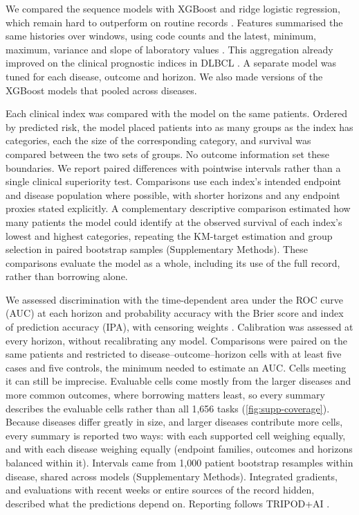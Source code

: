 We compared the sequence models with XGBoost \citep{chen2016xgboost} and ridge
logistic regression, which remain hard to outperform on routine records
\citep{grinsztajn2022tabular}. Features summarised the same histories over
 windows, using code counts and the latest,
minimum, maximum, variance and slope of laboratory values
\citep{bernstorff2023tsflattener}. This aggregation already improved on the
clinical prognostic indices in DLBCL \citep{werling2026dlbcl}. A separate model
was tuned for each disease, outcome and horizon. We also made versions of the
XGBoost models that pooled across diseases.

Each clinical index was compared with the model on the same patients. Ordered
by predicted risk, the model placed patients into as many groups as the index
has categories, each the size of the corresponding category, and survival was
compared between the two sets of groups. No outcome information set these
boundaries. We report paired differences with pointwise intervals rather than
a single clinical superiority test. Comparisons use each index's intended
endpoint and disease population where possible, with shorter horizons and any
endpoint proxies stated explicitly. A complementary descriptive comparison estimated how many patients the model
could identify at the observed survival of each index's lowest and highest
categories, repeating the KM-target estimation and group selection in paired
bootstrap samples (Supplementary Methods). These comparisons evaluate the model as a whole, including its use
of the full record, rather than borrowing alone.

We assessed discrimination with the time-dependent area under the ROC curve
(AUC) at each horizon and probability accuracy with the Brier score and index of
prediction accuracy (IPA), with censoring weights
\citep{blanche2013competingauc,gerds2006brier,kattan2018ipa}. Calibration was
assessed at every horizon, without recalibrating any model. Comparisons were
paired on the same patients and restricted to disease--outcome--horizon cells
with at least five cases and five controls, the minimum needed to estimate an
AUC. Cells meeting it can still be imprecise. Evaluable cells come mostly from
the larger diseases and more common outcomes, where borrowing matters least, so
every summary describes the evaluable cells rather than all 1,656 tasks
(\cref{fig:supp-coverage}). Because diseases differ greatly in
size, and larger diseases contribute more cells, every summary is reported two
ways:
with each supported cell weighing equally, and with each disease weighing
equally (endpoint families, outcomes and horizons balanced within it). Intervals
came from 1,000 patient bootstrap resamples within disease, shared across
models (Supplementary Methods). Integrated gradients, and evaluations with
recent weeks or entire sources of the record hidden, described what the
predictions depend on. Reporting follows
TRIPOD+AI \citep{collins2024tripodai}.

